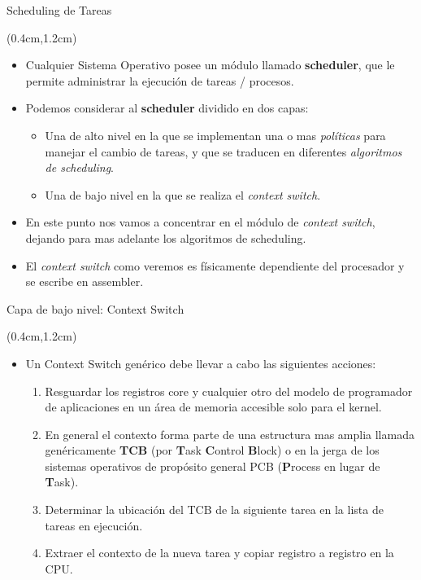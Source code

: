 \begin{frame}{Scheduling de Tareas}
 \begin{textblock*}{\textwidth}(0.4cm,1.2cm)
  \begin{itemize}[<+(1)->] \justifying \parskip 0.3cm
   \item Cualquier Sistema Operativo posee un módulo llamado \textbf{scheduler}, que le permite administrar la ejecución de tareas / procesos.
   \item Podemos considerar al \textbf{scheduler} dividido en dos capas: 
   \begin{itemize} \justifying \parskip 0.3cm
    \item [\checkmark]Una de alto nivel en la que se implementan una o mas \textit{políticas} para manejar el cambio de tareas, y que se traducen en diferentes \textit{algoritmos de scheduling}.
    \item [\checkmark]Una de bajo nivel en la que se realiza el \textit{context switch}.
   \end{itemize}
   \item En este punto nos vamos a concentrar en el módulo de \textit{context switch}, dejando para mas adelante los algoritmos de scheduling.
   \item El \textit{context switch} como veremos es físicamente dependiente del procesador y se escribe en assembler.
  \end{itemize}
 \end{textblock*}
\end{frame}

\begin{frame}{Capa de bajo nivel: Context Switch}
 \begin{textblock*}{\textwidth}(0.4cm,1.2cm)
  \begin{itemize}[<+(1)->] \justifying \parskip 0.3cm
   \item Un Context Switch genérico debe llevar a cabo las siguientes acciones:
   \begin{enumerate} \justifying \parskip 0.3cm
    \item Resguardar los registros core y cualquier otro del modelo de programador de aplicaciones en un área de memoria accesible solo para el kernel.
    \item En general el contexto forma parte de una estructura mas amplia llamada genéricamente \textbf{TCB} (por \textbf{T}ask \textbf{C}ontrol \textbf{B}lock) o en la jerga de los sistemas operativos de propósito general PCB (\textbf{P}rocess en lugar de \textbf{T}ask).
    \item Determinar la ubicación del TCB de la siguiente tarea en la lista de tareas en ejecución.
    \item Extraer el contexto de la nueva tarea y copiar registro a registro en la CPU.
   \end{enumerate}
  \end{itemize}
 \end{textblock*}
\end{frame}


